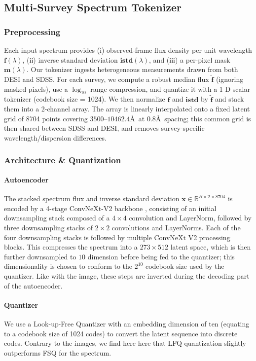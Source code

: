 \documentclass[]{polymathic}
\begin{document}
\subsection{Multi-Survey Spectrum Tokenizer} 
\label{spectrum_tokenizer}

\subsubsection{Preprocessing}
Each input spectrum provides (i) observed‐frame flux density per unit wavelength $\mathbf{f}(\lambda)$, (ii) inverse standard deviation $\mathbf{istd}(\lambda)$, and (iii) a per-pixel mask $\mathbf{m}(\lambda)$. Our tokenizer ingests heterogeneous measurements drawn from both DESI and SDSS. For each survey, we compute a robust median flux $\tilde{\mathbf{f}}$ (ignoring masked pixels), use a $\log_{10}$ range compression, and quantize it with a 1-D scalar tokenizer (codebook size = 1024). We then normalize $\mathbf{f}$ and $\mathbf{istd}$ by $\tilde{\mathbf{f}}$ and stack them into a 2-channel array.
The array is linearly interpolated onto a fixed latent grid of 8704 points covering $3500$–$10462.4$\AA\ at 0.8\AA\ spacing; this common grid is then shared between SDSS and DESI, and removes survey-specific wavelength/dispersion differences.

\subsubsection{Architecture \& Quantization}
\paragraph{Autoencoder} The stacked spectrum flux and inverse standard deviation $\mathbf{x}\in\mathbb{R}^{B\times2\times8704}$ is encoded by a 4-stage ConvNeXt-V2 backbone \citep{woo2023convnext}, consisting of an initial downsampling stack composed of a $4 \times 4$ convolution and LayerNorm, followed by three downsampling stacks of $2 \times 2$ convolutions and LayerNorms. Each of the four downsampling stacks is followed by multiple
ConvNeXt V2 processing blocks. This compresses the spectrum into a $273 \times 512$ latent space, which is then further downsampled to $10$ dimension before being fed to the quantizer; this dimensionality is chosen to conform to the $2^{10}$ codebook size used by the quantizer. Like with the image, these steps are inverted during the decoding part of the autoencoder.

\paragraph{Quantizer} We use a Look-up-Free Quantizer \citep[LFQ;][]{yu2023language} with an embedding dimension of ten (equating to a codebook size of 1024 codes) to convert the latent sequence into discrete codes. Contrary to the images, we find here here that LFQ quantization slightly outperforms FSQ for the spectrum.
\end{document}
